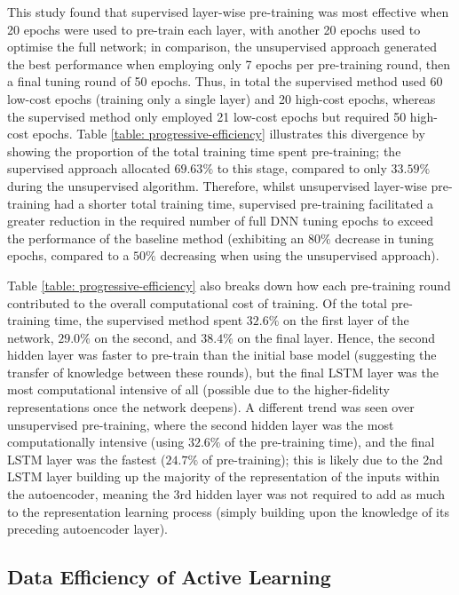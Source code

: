 \documentclass[a4paper, 11pt]{report}
\begin{document}
    This study found that supervised layer-wise pre-training was most effective when 20 epochs were used to pre-train each layer, with another 20 epochs used to optimise the full network; in comparison, the unsupervised approach generated the best performance when employing only 7 epochs per pre-training round, then a final tuning round of 50 epochs. Thus, in total the supervised method used 60 low-cost epochs (training only a single layer) and 20 high-cost epochs, whereas the supervised method only employed 21 low-cost epochs but required 50 high-cost epochs. Table \ref{table: progressive-efficiency} illustrates this divergence by showing the proportion of the total training time spent pre-training; the supervised approach allocated $69.63\%$ to this stage, compared to only $33.59\%$ during the unsupervised algorithm. Therefore, whilst unsupervised layer-wise pre-training had a shorter total training time, supervised pre-training facilitated a greater reduction in the required number of full DNN tuning epochs to exceed the performance of the baseline method (exhibiting an $80\%$ decrease in tuning epochs, compared to a $50\%$ decreasing when using the unsupervised approach).

    Table \ref{table: progressive-efficiency} also breaks down how each pre-training round contributed to the overall computational cost of training. Of the total pre-training time, the supervised method spent $32.6\%$ on the first layer of the network, $29.0\%$ on the second, and $38.4\%$ on the final layer. Hence, the second hidden layer was faster to pre-train than the initial base model (suggesting the transfer of knowledge between these rounds), but the final LSTM layer was the most computational intensive of all (possible due to the higher-fidelity representations once the network deepens). A different trend was seen over unsupervised pre-training, where the second hidden layer was the most computationally intensive (using $32.6\%$ of the pre-training time), and the final LSTM layer was the fastest ($24.7\%$ of pre-training); this is likely due to the 2nd LSTM layer building up the majority of the representation of the inputs within the autoencoder, meaning the 3rd hidden layer was not required to add as much to the representation learning process (simply building upon the knowledge of its preceding autoencoder layer).


    \subsection{Data Efficiency of Active Learning}
\end{document}
